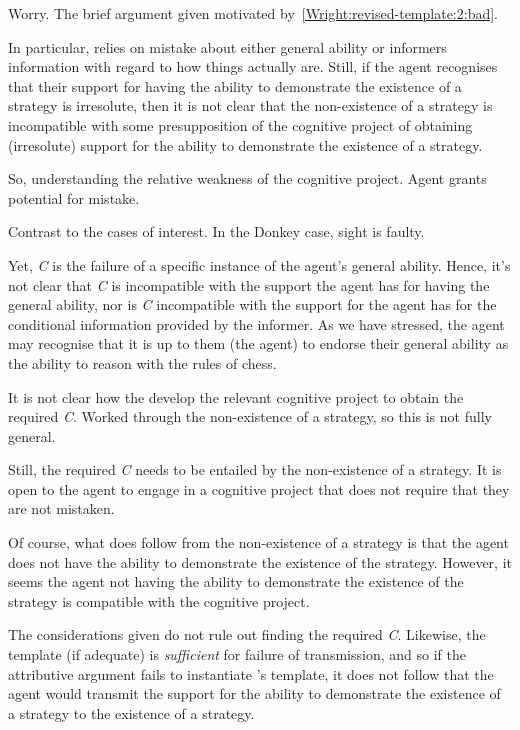 \documentclass[10pt]{article}
\begin{document}
\begin{note}
  Worry.
  The brief argument given motivated by~\ref{Wright:revised-template:2:bad}.

  In particular, relies on mistake about either general ability or informers information with regard to how things actually are.
  Still, if the agent recognises that their support for having the ability to demonstrate the existence of a strategy is irresolute, then it is not clear that the non-existence of a strategy is incompatible with some presupposition of the cognitive project of obtaining (irresolute) support for the ability to demonstrate the existence of a strategy.

  So, understanding the relative weakness of the cognitive project.
  Agent grants potential for mistake.

  Contrast to the cases of interest.
  In the Donkey case, sight is faulty.

  Yet, \emph{C} is the failure of a specific instance of the agent's general ability.
  Hence, it's not clear that \emph{C} is incompatible with the support the agent has for having the general ability, nor is \emph{C} incompatible with the support for the agent has for the conditional information provided by the informer.
  As we have stressed, the agent may recognise that it is up to them (the agent) to endorse their general ability as the ability to reason with the rules of chess.

  It is not clear how the develop the relevant cognitive project to obtain the required \emph{C}.
  Worked through the non-existence of a strategy, so this is not fully general.

  Still, the required \emph{C} needs to be entailed by the non-existence of a strategy.
  It is open to the agent to engage in a cognitive project that does not require that they are not mistaken.

  Of course, what does follow from the non-existence of a strategy is that the agent does not have the ability to demonstrate the existence of the strategy.
  However, it seems the agent not having the ability to demonstrate the existence of the strategy is compatible with the cognitive project.
\end{note}

\begin{note}
  The considerations given do not rule out finding the required \emph{C}.
  Likewise, the template (if adequate) is \emph{sufficient} for failure of transmission, and so if the attributive argument fails to instantiate \citeauthor{Wright:2011wn}'s template, it does not follow that the agent would transmit the support for the ability to demonstrate the existence of a strategy to the existence of a strategy.
\end{note}
\end{document}
